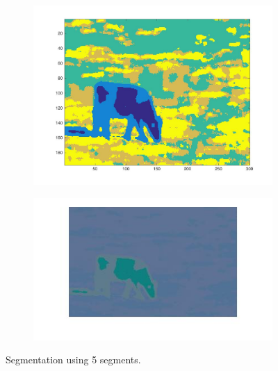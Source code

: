 \documentclass{ethz_report}
\begin{document}
\begin{figure}[h]
    \centering
    \begin{subfigure}[b]{.5\textwidth}
        \centering
        \includegraphics[width=1\linewidth]{images/seg_K_5}
    \end{subfigure}%
    \begin{subfigure}[b]{.5\textwidth}
        \centering
        \includegraphics[width=1\linewidth]{images/seg_K_5_color}
    \end{subfigure}
    \caption{Segmentation using 5 segments.}
    \label{fig:seg_k5}
\end{figure}
\end{document}
